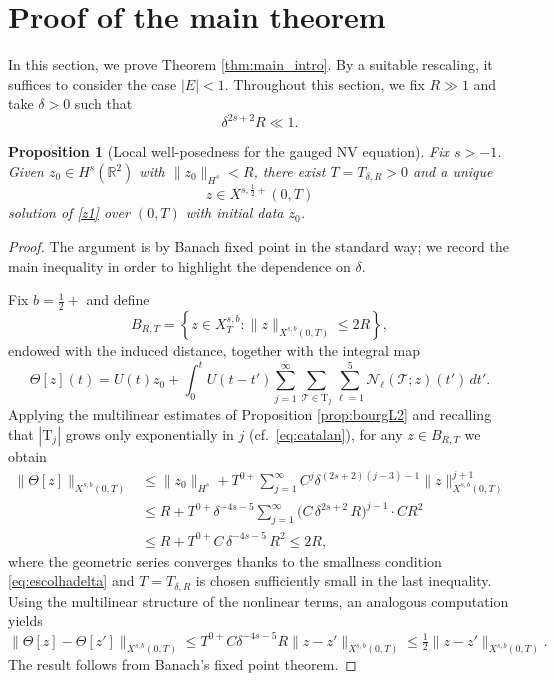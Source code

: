 \documentclass[a4paper,
11pt,  reqno]{amsart}
\newcommand{\5}{\textup{V}}
\newtheorem{proposition}[theorem]{Proposition}
\theoremstyle{remark}
\newcommand{\R}{\mathbb{R}}
\newcommand{\TT}{\mathcal{T}}
\newcommand{\Tr}{\mathrm{T}}
\renewcommand{\l}{\ell}
\numberwithin{equation}{section}
\numberwithin{theorem}{section}
\newcommand{\Ncal}{\mathcal{N}}
\begin{document}






\section{Proof of the main theorem}\label{sec:lwp}

In this section, we prove Theorem \ref{thm:main_intro}. By a suitable rescaling, it suffices to consider the case $|E|<1$. Throughout this section, we fix $R\gg 1$ and take $\delta>0$ such that
\begin{equation}\label{eq:escolhadelta}
\delta^{2s+2}R\ll 1.
\end{equation}

\begin{proposition}[Local well-posedness for the gauged NV equation]\label{prop:lwp_rnv}
Fix $s>-1$. Given $z_0\in H^s(\R^2)$ with $\|z_0\|_{H^s}<R$, there exist $T=T_{\delta,R}>0$ and a unique
$$
z\in X^{s,\frac12 +}(0,T)
$$
solution of \eqref{z1} over $(0,T)$ with initial data $z_0$.
\end{proposition}

\begin{proof}
The argument is by Banach fixed point in the standard way; we record the main inequality in order to highlight the dependence on $\delta$.

Fix $b=\frac12+$ and define
$$
B_{R,T}=\left\{ z\in X^{s,b}_T : \|z\|_{X^{s,b}(0,T)}\le 2R \right\},
$$
endowed with the induced distance, together with the integral map
$$
\Theta[z](t)=U(t)z_0 + \int_0^t U(t-t')\sum_{j=1}^\infty \sum_{\TT \in \Tr_j} \sum_{\l=1}^5  \Ncal_\l(\TT;z)(t')\,dt'.
$$
Applying the multilinear estimates of Proposition \ref{prop:bourgL2} and recalling that $|\Tr_j|$ grows only exponentially in $j$ (cf.~\eqref{eq:catalan}), for any $z\in B_{R,T}$ we obtain
\begin{align}
\|\Theta[z]\|_{X^{s,b}(0,T)}
&\le \|z_0\|_{H^s} + T^{0+}\sum_{j=1}^\infty C^j\delta^{(2s+2)(j-3)-1}\|z\|_{X^{s,b}(0,T)}^{j+1} \\
&\le R + T^{0+}\delta^{-4s-5}\sum_{j=1}^\infty \big(C \,\delta^{2s+2}\, R\big)^{j-1} \cdot C R^2 \\
&\le R + T^{0+} C \,\delta^{-4s-5}\, R^2 \le 2R,
\end{align}
where the geometric series converges thanks to the smallness condition \eqref{eq:escolhadelta} and $T=T_{\delta,R}$ is chosen sufficiently small in the last inequality. Using the multilinear structure of the nonlinear terms, an analogous computation yields
$$
\|\Theta[z]-\Theta[z']\|_{X^{s,b}(0,T)} \le T^{0+}C\delta^{-4s-5}R\|z-z'\|_{X^{s,b}(0,T)} \le \tfrac12\|z-z'\|_{X^{s,b}(0,T)}.
$$
The result follows from Banach's fixed point theorem.
\end{proof}
\end{document}
